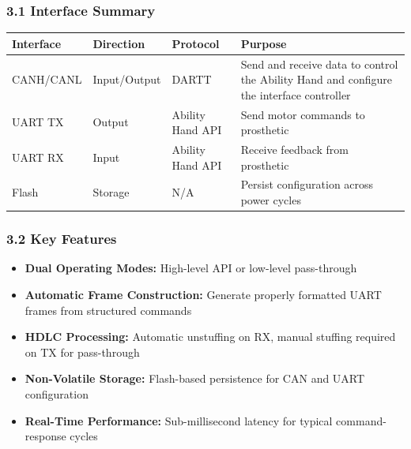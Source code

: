 \documentclass[
  11pt,
]{article}
\newcounter{none} %
\providecommand{\tightlist}{%
  \setlength{\itemsep}{0pt}\setlength{\parskip}{0pt}}
\begin{document}
\subsubsection{3.1 Interface Summary}\label{interface-summary}

{\def\LTcaptype{none} %
\begin{longtable}[]{@{}
  >{\raggedright\arraybackslash}p{}
  >{\raggedright\arraybackslash}p{}
  >{\raggedright\arraybackslash}p{}
  >{\raggedright\arraybackslash}p{}@{}}
\toprule\noalign{}
\begin{minipage}[b]{\linewidth}\raggedright
Interface
\end{minipage} & \begin{minipage}[b]{\linewidth}\raggedright
Direction
\end{minipage} & \begin{minipage}[b]{\linewidth}\raggedright
Protocol
\end{minipage} & \begin{minipage}[b]{\linewidth}\raggedright
Purpose
\end{minipage} \\
\midrule\noalign{}
\endhead
\bottomrule\noalign{}
\endlastfoot
CANH/CANL & Input/Output & DARTT & Send and receive data to control the
Ability Hand and configure the interface controller \\
UART TX & Output & Ability Hand API & Send motor commands to
prosthetic \\
UART RX & Input & Ability Hand API & Receive feedback from prosthetic \\
Flash & Storage & N/A & Persist configuration across power cycles \\
\end{longtable}
}

\subsubsection{3.2 Key Features}\label{key-features}

\begin{itemize}
\tightlist
\item
  \textbf{Dual Operating Modes:} High-level API or low-level
  pass-through
\item
  \textbf{Automatic Frame Construction:} Generate properly formatted
  UART frames from structured commands
\item
  \textbf{HDLC Processing:} Automatic unstuffing on RX, manual stuffing
  required on TX for pass-through
\item
  \textbf{Non-Volatile Storage:} Flash-based persistence for CAN and
  UART configuration
\item
  \textbf{Real-Time Performance:} Sub-millisecond latency for typical
  command-response cycles
\end{itemize}
\end{document}
